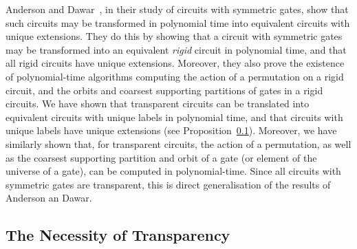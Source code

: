 \documentclass[../paper.tex]{subfiles}
\begin{document}
Anderson and Dawar~\cite{AndersonD17}, in their study of circuits with symmetric
gates, show that such circuits may be transformed in polynomial time into
equivalent circuits with unique extensions. They do this by showing that a
circuit with symmetric gates may be transformed into an equivalent \emph{rigid}
circuit in polynomial time, and that all rigid circuits have unique extensions.
Moreover, they also prove the existence of polynomial-time algorithms computing
the action of a permutation on a rigid circuit, and the orbits and coarsest
supporting partitions of gates in a rigid circuits. We have shown that
transparent circuits can be translated into equivalent circuits with unique
labels in polynomial time, and that circuits with unique labels have unique
extensions (see Proposition~\ref{}). Moreover, we have similarly shown that, for
transparent circuits, the action of a permutation, as well as the coarsest
supporting partition and orbit of a gate (or element of the universe of a gate),
can be computed in polynomial-time. Since all circuits with symmetric gates are
transparent, this is direct generalisation of the results of Anderson an Dawar.

\subsection{The Necessity of Transparency}


\end{document}
